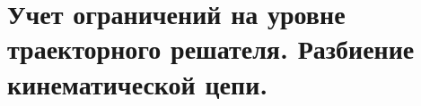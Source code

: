 \section{Учет ограничений на уровне траекторного решателя. Разбиение кинематической цепи.}\label{restr_traj}